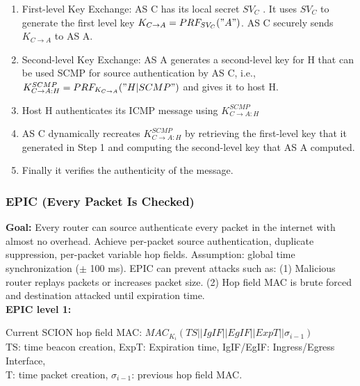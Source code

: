 \documentclass[11pt,oneside,a4paper]{article}
\begin{document}
\vspace{-\topsep}
\begin{enumerate}
	\setlength{\itemsep}{0pt}
	\setlength{\parskip}{0pt}
	\item First-level Key Exchange: AS C has its local secret $SV_C$ . It uses $SV_C$ to generate the first
	level key $K_{C\rightarrow A} = PRF_{SV_C}("A")$. AS C securely sends $K_{C\rightarrow A}$ to AS A.
	
	\item Second-level Key Exchange: AS A generates a second-level key for H that can be used SCMP for source authentication by AS C, i.e., $K_{C\rightarrow A:H}^{SCMP} = PRF_{K_{C\rightarrow A}}("H|SCMP")$ and gives it to host H.
	
	\item Host H authenticates its ICMP message using $K_{C\rightarrow A:H}^{SCMP}$
	
	\item AS C dynamically recreates $K_{C\rightarrow A:H}^{SCMP}$ by retrieving the first-level key that it generated in Step 1 and computing the second-level key that AS A computed.
	
	\item Finally it verifies the authenticity of the message.
\end{enumerate}
\vspace{-\topsep}

\newpage

\subsubsection{EPIC (Every Packet Is Checked)}

\textbf{Goal:} Every router can source authenticate every packet in the internet with almost no overhead. Achieve per-packet source authentication, duplicate suppression, per-packet variable hop fields. Assumption: global time synchronization ($\pm$ 100 ms). EPIC can prevent attacks such as: (1) Malicious router replays packets or increases packet size. (2) Hop field MAC is brute forced and destination attacked until expiration time.\\

\textbf{EPIC level 1:} 

Current SCION hop field MAC: $MAC_{K_i}(TS||IgIF||EgIF||ExpT||\sigma_{i-1})$\\

TS: time beacon creation, ExpT: Expiration time, IgIF/EgIF: Ingress/Egress Interface,\\
T: time packet creation, $\sigma_{i-1}$: previous hop field MAC.\\
\end{document}
